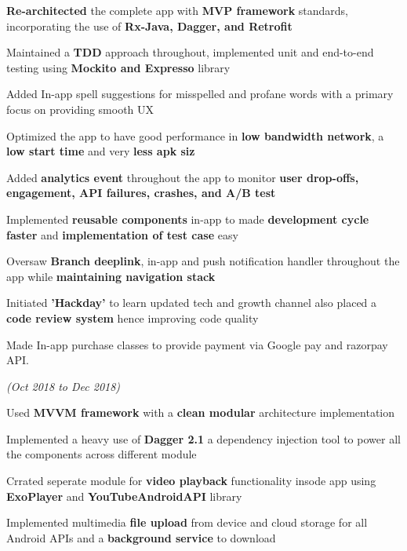 \documentclass[a4paper]{deedy-resume} %
\begin{document}
\begin{tightitemize}
\item \textbf{Re-architected} the complete app with \textbf{MVP framework} standards, incorporating the use of \textbf{Rx-Java, Dagger, and Retrofit}
\item Maintained a \textbf{TDD} approach throughout, implemented unit and end-to-end testing using \textbf{Mockito and Expresso} library
\item Added In-app spell suggestions for misspelled and profane words with a primary focus on providing smooth UX
\item Optimized the app to have good performance in \textbf{low bandwidth network}, a \textbf{low start time} and very \textbf{less apk siz}
\item Added \textbf{analytics event} throughout the app to monitor \textbf{user drop-offs, engagement, API failures, crashes, and A/B test}
\item Implemented \textbf{reusable components} in-app to made \textbf{development cycle faster} and \textbf{implementation of test case} easy
\item  Oversaw \textbf{Branch deeplink}, in-app and push notification handler throughout the app while \textbf{maintaining navigation stack}
\item Initiated \textbf{'Hackday'} to learn updated tech and growth channel also placed a \textbf{code review system} hence improving code quality
\item Made In-app purchase classes to provide payment via Google pay and razorpay API.
\end{tightitemize}
\microspace



\hfill {\textit{\small(Oct 2018 to Dec 2018)}}\\

\begin{tightitemize}
\item Used  \textbf{MVVM framework} with a  \textbf{clean modular} architecture implementation
\item Implemented a heavy use of  \textbf{Dagger 2.1} a dependency injection tool to power all the components across different module
\item Crrated seperate module for \textbf{video playback} functionality insode app using \textbf{ExoPlayer} and \textbf{YouTubeAndroidAPI} library
\item Implemented multimedia \textbf{file upload} from device and cloud storage for all Android APIs and a \textbf{background service} to download
\end{tightitemize}
\microspace
\end{document}
